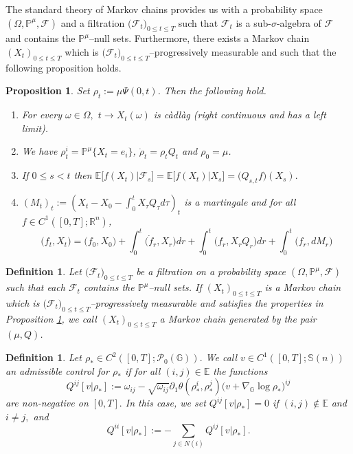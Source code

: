 \documentclass[10pt]{article}
\newtheorem{definition}[theorem]{Definition}
\newtheorem{proposition}[theorem]{Proposition}
\numberwithin{equation}{section}
\newcommand{\cF}{ \mathcal{F}}
\newcommand{\cP}{ \mathcal{P}}
\newcommand{\bE}{\mathbb E}
\newcommand{\bP}{\mathbb P}
\newcommand{\R}{\mathbb R}
\newcommand{\bS}{\mathbb S}
\def\R{{\mathbb{R}}}
\def\G{\mathbb{G}}
\begin{document}
The standard theory of Markov chains provides us with a probability space $(\Omega, \bP^\mu, \cF)$ and a filtration $\big(\cF_t\big)_{0 \leq t\leq T}$ such that $\cF_t$ is a sub-$\sigma$-algebra of $\cF$ and contains the $\bP^\mu$--null sets. Furthermore, there exists a Markov chain $(X_t)_{0 \leq t\leq T}$ which is $\big(\cF_t\big)_{0 \leq t\leq T}$--progressively measurable and such that the following proposition holds. 
%
%
\begin{proposition}\label{prop:feb05.2025.6sum} Set $\rho_t:=\mu \Psi(0, t)$. Then the  following hold.
\begin{enumerate}
\item[(i)] For every $\omega \in \Omega,$ $t \to X_t(\omega)$ is c\`adl\`ag (right continuous and has a left limit).
\item[(ii)] We have $\rho^i_t=\bP^\mu\big\{X_t=e_i \big\}$, $\dot \rho_t=\rho_t Q_t$ and $\rho_0=\mu$.
\item[(iii)] If $0\leq s<t$ then  $\bE\big[f(X_t)| \cF_s \big]=\bE\big[f(X_t)| X_s \big]=\big(\hat Q_{s,t} f\big)(X_s).$ 
\item[(iv)] $(M_t)_t:=(X_t-X_0 -\int_0^t X_\tau Q_\tau d\tau)_t$ is a martingale and for all $f \in C^1([0,T];\R^n)$,     
\begin{equation}\label{eq:Feb07.2026.9}
\big(f_t, X_t\big)=\big(f_0, X_0\big)+\int_0^t \big( \dot f_r, X_r\big)dr  + \int_0^t \big( f_r,X_r Q_{r} \big) dr +\int_0^t \big( f_r, dM_r\big)
\end{equation}
\end{enumerate}
\end{proposition}
%
%
\begin{definition}\label{defn:mar10.2026.5} Let $\big(\cF_t\big)_{0 \leq t\leq T}$ be a filtration on a probability space $(\Omega, \bP^\mu, \cF)$ such that each $\cF_t$ contains the $\bP^\mu$--null sets. If $(X_t)_{0 \leq t\leq T}$ is a Markov chain which is $\big(\cF_t\big)_{0 \leq t\leq T}$--progressively measurable and satisfies the properties in Proposition \ref{prop:feb05.2025.6sum}, we call $(X_t)_{0 \leq t\leq T}$ a Markov chain generated by the pair $(\mu, Q)$. 
\end{definition}
%
%
\begin{definition}\label{defn:mar10.2026.3} Let $\rho_* \in C^2([0, T]; \cP_0(\G)).$ We call $v \in C^1([0, T]; \bS(n))$ an admissible control for $\rho_*$ if for all $(i, j) \in \bE$ the functions
\begin{equation}\label{eq:mar10.2025.3}
Q^{ij}[v|\rho_*]:=\omega_{ij}-\sqrt{\omega_{ij}}\partial_1 \theta(\rho^i_*, \rho^j_*)\big(v + \nabla_\G \log \rho_*\big)^{ij}
\end{equation}
are non-negative on $[0, T].$ In this case, we set $Q^{ij}[v|\rho_*]=0$ if $(i, j) \not \in \bE$ and $i \not =j,$ and 
\begin{equation}\label{eq:mar10.2025.4}
Q^{ii}[v|\rho_*]:=-\sum_{j \in N(i)} Q^{ij}[v|\rho_*].
\end{equation}
\end{definition}
\end{document}

